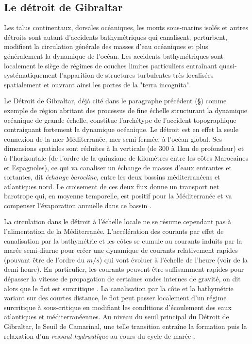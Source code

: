 
\subsection{Le détroit de Gibraltar}
\color{blue}
Les talus continentaux, dorsales océaniques, les monts sous-marins isolés et autres détroits sont autant d'accidents bathymétriques qui canalisent, perturbent, modifient la circulation générale des masses d'eau océaniques et plus généralement la dynamique de l'océan. Les accidents bathymétriques sont localement le siège de régimes de couches limites particuliers entraînant quasi-systématiquement l'apparition de structures turbulentes très localisées spatialement et ouvrant ainsi les portes de la "terra incognita".

Le Détroit de Gibraltar, déjà cité dans le paragraphe précédent (\S {}) comme exemple de région abritant des processus de fine échelle structurant la dynamique océanique de grande échelle, constitue l'archétype de l'accident topographique contraignant fortement la dynamique océanique. \color{red}Le détroit est en effet la seule connexion de la mer Méditerranée, mer semi-fermée, à l'océan global. Ses dimensions spatiales sont réduites à la verticale (de 300 à 1km de profondeur) et à l'horizontale (de l'ordre de la quinziane de kilomètres entre les côtes Marocaines et Espagnoles), ce qui va canaliser un échange de masses d'eaux entrantes et sortantes, dit \textit{échange barocline}, entre les deux bassins méditerranéens et atlantiques nord. Le croisement de ces deux flux donne un transport net barotrope qui, en moyenne temporelle, est positif pour la Méditerranée et va compenser l'évaporation annuelle dans ce bassin \citep{Bryden94}.

La circulation dans le détroit à l'échelle locale ne se résume cependant pas à l'alimentation de la Méditerranée. L'accélération des courants par effet de canalisation par la bathymétrie et les côtes se cumule au courants induits par la marée semi-diurne pour créer une dynamique de courants relativement rapides (pouvant être de l'ordre du $m/s$) qui vont évoluer à l'échelle de l'heure (voir de la demi-heure). En particulier, les courants peuvent être suffisamment rapides pour dépasser la vitesse de propagation de certaines ondes internes de gravité, on dit alors que le flot est surcritique \citep{Baines1995}. La canalisation par la côte et la bathymétrie variant sur des courtes distance, le flot peut passer localement d'un régime surcritique à sous-critique en modifiant les conditions d'écoulement des eaux atlantiques et méditerranéennes. Au niveau du seuil principal du Détroit de Gibraltar, le Seuil de Camarinal, une telle transition entraîne la formation puis la relaxation d'un \textit{ressaut hydraulique} au cours du cycle de marée \citep{FA1988}.

